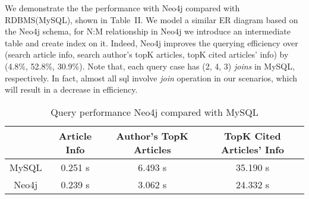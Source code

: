 

We demonstrate the the performance with Neo4j compared with RDBMS(MySQL), shown in Table~II. We model a similar ER diagram based on the Neo4j schema, for N:M relationship in Neo4j we introduce an intermediate table and create index on it. Indeed, Neo4j improves the querying efficiency over (search article info, search author's topK articles, topK cited articles' info) by (4.8\%, 52.8\%, 30.9\%). Note that, each query case has (2, 4, 3) {\em joins} in MySQL, respectively. In fact, almost all sql involve {\em join} operation in our scenarios, which will result in a decrease in efficiency.



\begin{table}[t!]
\label{tab-compare}
\begin{center}
\caption{Query performance Neo4j compared with MySQL}
\begin{scriptsize}
\begin{tabular}{ c c c c}
\hline
{} & {Article Info} & {Author's TopK Articles} & {TopK Cited Articles' Info}\\
\hline
MySQL & 0.251 s  & 6.493 s & 35.190 s \\
Neo4j & 0.239 s  & 3.062 s & 24.332 s \\
\hline
\end{tabular} \\ %
\end{scriptsize}
\end{center}
\end{table}

